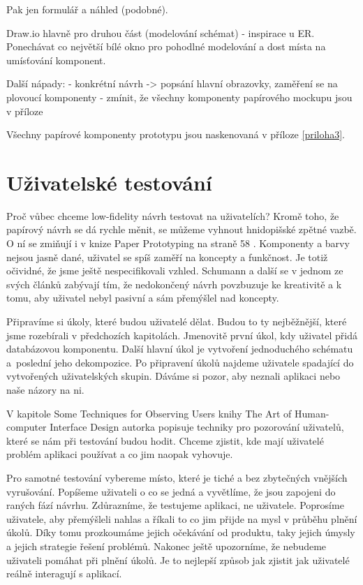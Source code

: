 Pak jen formulář a náhled (podobné).

Draw.io hlavně pro druhou část (modelování schémat) - inspirace u ER. Ponechávat co největší bílé okno pro pohodlné modelování a dost místa na umísťování komponent.

Další nápady:
- konkrétní návrh -> popsání hlavní obrazovky, zaměření se na plovoucí komponenty
- zmínit, že všechny komponenty papírového mockupu jsou v příloze

Všechny papírové komponenty prototypu jsou naskenovaná v příloze \ref{priloha3}.

\section{Uživatelské testování}

Proč vůbec chceme low-fidelity návrh testovat na uživatelích? Kromě toho, že papírový návrh se dá rychle měnit, se můžeme vyhnout hnidopišské zpětné vazbě. O ní se zmiňují i v knize Paper Prototyping na straně 58 \cite{Paper_Prototyping}. Komponenty a barvy nejsou jasně dané, uživatel se spíš zaměří na koncepty a funkčnost. Je totiž očividné, že jsme ještě nespecifikovali vzhled. Schumann a další se v jednom ze svých článků \cite{Schumann_1996_AEN} zabývají tím, že nedokončený návrh povzbuzuje ke kreativitě a k tomu, aby uživatel nebyl pasivní a sám přemýšlel nad koncepty. 

Připravíme si úkoly, které budou uživatelé dělat. Budou to ty nejběžnější, které jsme rozebírali v předchozích kapitolách. Jmenovitě první úkol, kdy uživatel přidá databázovou komponentu. Další hlavní úkol je vytvoření jednoduchého schématu a~poslední jeho dekompozice.
Po připravení úkolů najdeme uživatele spadající do vytvořených uživatelských skupin. Dáváme si pozor, aby neznali aplikaci nebo naše názory na ni.

V kapitole Some Techniques for Observing Users knihy The Art of Human-computer Interface Design \cite{Brenda_1990_art} autorka popisuje techniky pro pozorování uživatelů, které se nám při testování budou hodit. Chceme zjistit, kde mají uživatelé problém aplikaci používat a co jim naopak vyhovuje.

Pro samotné testování vybereme místo, které je tiché a bez zbytečných vnějších vyrušování. Popíšeme uživateli o co se jedná a vyvětlíme, že jsou zapojeni do raných fází návrhu. Zdůrazníme, že testujeme aplikaci, ne uživatele. Poprosíme uživatele, aby přemýšleli nahlas a říkali to co jim přijde na mysl v průběhu plnění úkolů. Díky tomu prozkoumáme jejich očekávání od produktu, taky jejich úmysly a jejich strategie řešení problémů. Nakonec ještě upozorníme, že nebudeme uživateli pomáhat při plnění úkolů. Je to nejlepší způsob jak zjistit jak uživatelé reálně interagují s aplikací.

